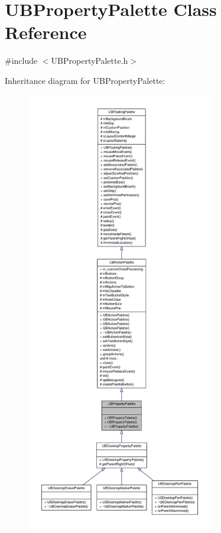 \hypertarget{class_u_b_property_palette}{\section{U\-B\-Property\-Palette Class Reference}
\label{d4/df1/class_u_b_property_palette}
}


{\ttfamily \#include $<$U\-B\-Property\-Palette.\-h$>$}



Inheritance diagram for U\-B\-Property\-Palette\-:
\nopagebreak
\begin{figure}[H]
\begin{center}
\leavevmode
\includegraphics[height=550pt]{dc/d65/class_u_b_property_palette__inherit__graph}
\end{center}
\end{figure}


